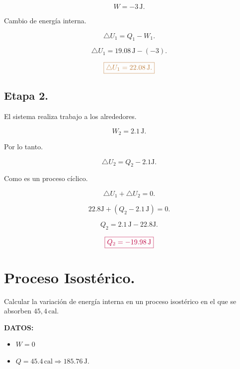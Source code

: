 \documentclass[a4paper,12pt]{article} %
\begin{document}
\[ W = -3 \, \mathrm{J}. \]

\begin{justify}
	Cambio de energía interna.
\end{justify}

\[ \triangle U_1 = Q_1 - W_1. \]

\[ \triangle U_1 = 19.08 \, \mathrm{J} - \left( -3 \right). \]

\[ \textcolor{brown}{\boxed{ \triangle U_1 = 22.08 \, \mathrm{J}.}} \]

\subsection{Etapa 2.}

\begin{justify}
	El sistema realiza trabajo a los alrededores.
\end{justify}

\[ W_2 = 2.1 \, \mathrm{J}. \]

\begin{justify}
	Por lo tanto.
\end{justify}

\[ \triangle U_2 = Q_2 - 2.1 \mathrm{J}. \]

\begin{justify}
	Como es un proceso cíclico.
\end{justify}

\[ \triangle U_1 + \triangle U_2 = 0. \]

\[ 22.8 \mathrm{J} + \left( Q_2 -  2.1 \, \mathrm{J} \right) = 0. \]

\[ Q_2 = 2.1 \, \mathrm{J} - 22.8 \mathrm{J}. \]

\[ \textcolor{purple}{\boxed{ Q_2 = - 19.98 \, \mathrm{J} }} \]

\section{Proceso Isostérico.}

\begin{justify}
	Calcular la variación de energía interna en un proceso isostérico en el que se absorben \( 45,4 \, \mathrm{cal}\).
\end{justify}

\begin{justify}
	\textbf{DATOS:}
\end{justify}

\begin{itemize}
	\item \( W = 0 \)
	\item \( Q = 45.4 \, \mathrm{cal}  \Rightarrow 185.76 \, \mathrm{J}. \)
\end{itemize}
\end{document}
